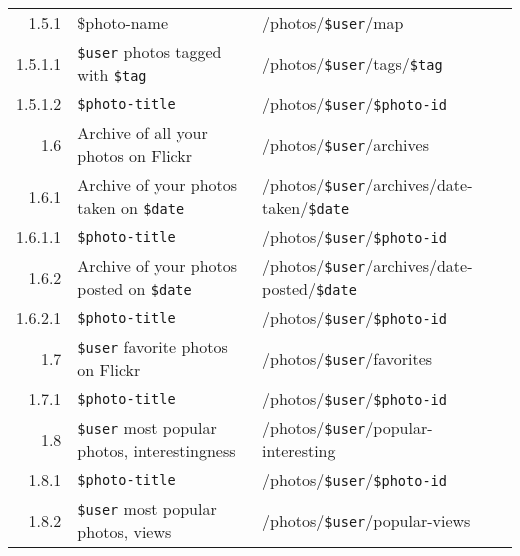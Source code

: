 \documentclass[11pt,a4paper]{article}
\newcommand{\var}[1]{\texttt{\${#1}}}
\begin{document}
\begin{center}
\begin{adjustwidth}{-8em}{-8em}
\begin{small}
\begin{longtable}{r|l|l}
                1.5.1 &
                \$photo-name &
                /photos/\var{user}/map \\

                  1.5.1.1 &
                  \var{user} photos tagged with \var{tag} &
                  /photos/\var{user}/tags/\var{tag} \\

                  1.5.1.2 &
                  \var{photo-title} &
                  /photos/\var{user}/\var{photo-id} \\

              1.6 &
              Archive of all your photos on Flickr &
              /photos/\var{user}/archives \\

                1.6.1 &
                Archive of your photos taken on \var{date} &
                /photos/\var{user}/archives/date-taken/\var{date} \\

                  1.6.1.1 &
                  \var{photo-title} &
                  /photos/\var{user}/\var{photo-id} \\

                1.6.2 &
                Archive of your photos posted on \var{date} &
                /photos/\var{user}/archives/date-posted/\var{date} \\

                  1.6.2.1 &
                  \var{photo-title} &
                  /photos/\var{user}/\var{photo-id} \\

              1.7 &
              \var{user} favorite photos on Flickr &
              /photos/\var{user}/favorites \\

                1.7.1 &
                \var{photo-title} &
                /photos/\var{user}/\var{photo-id} \\

              1.8 &
              \var{user} most popular photos, interestingness &
              /photos/\var{user}/popular-interesting \\

                1.8.1 &
                \var{photo-title} &
                /photos/\var{user}/\var{photo-id} \\

                1.8.2 &
                \var{user} most popular photos, views &
                /photos/\var{user}/popular-views \\


\end{longtable}
\end{small}
\end{adjustwidth}
\end{center}
\end{document}

